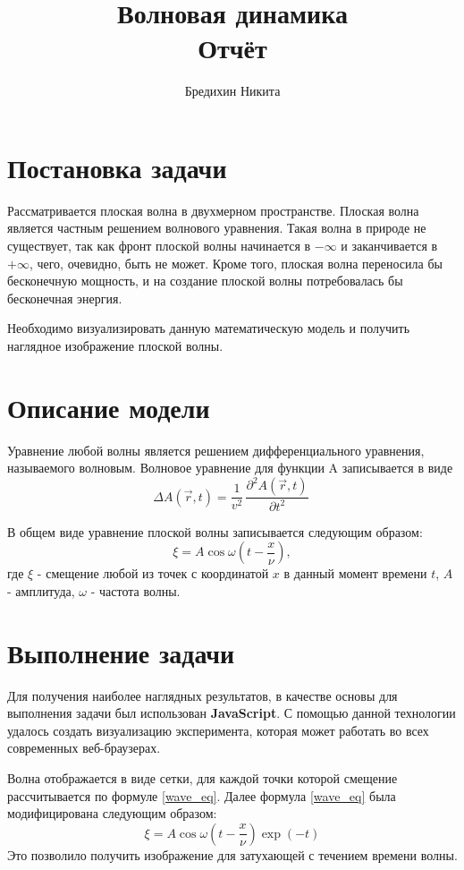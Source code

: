 \documentclass[12pt]{article}
\begin{document}
\title{
	Волновая динамика \\
	Отчёт
}
\author{Бредихин Никита}
\date{}
\maketitle

\section{Постановка задачи}
Рассматривается плоская волна в двухмерном пространстве. Плоская волна является частным решением волнового уравнения. Такая волна в природе не существует, так как фронт плоской волны начинается в $-\infty$ и заканчивается в $+\infty$, чего, очевидно, быть не может. Кроме того, плоская волна переносила бы бесконечную мощность, и на создание плоской волны потребовалась бы бесконечная энергия.

Необходимо визуализировать данную математическую модель и получить наглядное изображение плоской волны.
\section{Описание модели}
Уравнение любой волны является решением дифференциального уравнения, называемого волновым. Волновое уравнение для функции A записывается в виде
$$
	\Delta A(\vec{r},t) = \frac {1} {v^2} \, \frac {\partial^2 A(\vec{r},t)} {\partial t^2} \
$$

В общем виде уравнение плоской волны записывается следующим образом:
\begin{equation}
\label{wave_eq}
	\xi = A\cos\omega\left(t-\frac{x}{\nu}\right),
\end{equation}
где $\xi$ - смещение любой из точек с координатой $x$ в данный момент времени $t$, $A$ - амплитуда, $\omega$ - частота волны.

\section{Выполнение задачи}
Для получения наиболее наглядных результатов, в качестве основы для выполнения задачи был использован \textbf{JavaScript}. С помощью данной технологии удалось создать визуализацию эксперимента, которая может работать во всех современных веб-браузерах.

Волна отображается в виде сетки, для каждой точки которой смещение рассчитывается по формуле \eqref{wave_eq}. Далее формула \eqref{wave_eq} была модифицирована следующим образом:
\begin{equation}
\label{wave_eq}
	\xi = A\cos\omega\left(t-\frac{x}{\nu}\right) \exp(-t)
\end{equation}
Это позволило получить изображение для затухающей с течением времени волны.
\end{document}
